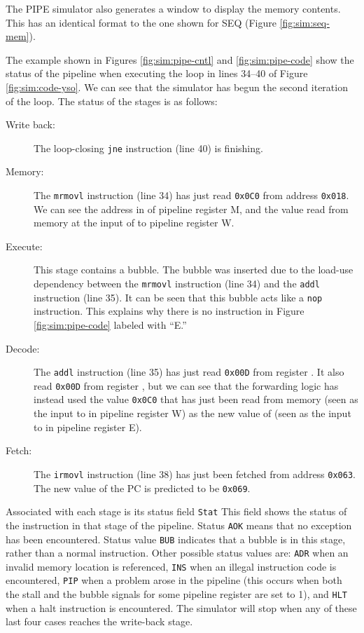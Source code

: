 \documentclass[11pt]{article}
\begin{document}
The PIPE simulator also generates a window to display the memory
contents.  This has an identical format to the one shown for SEQ
(Figure \ref{fig:sim:seq-mem}).

The example shown in Figures \ref{fig:sim:pipe-cntl} and
\ref{fig:sim:pipe-code} show the status of the pipeline when executing
the loop in lines 34--40 of Figure \ref{fig:sim:code-yso}.  We can see
that the simulator has begun the second iteration of the loop.
The status of the stages is as follows:
\begin{description}
\item[Write back:] The loop-closing \texttt{jne} instruction (line 40) is finishing.

\item[Memory:] The \texttt{mrmovl} instruction (line 34) has just read
\texttt{0x0C0} from address \texttt{0x018}.  We can see the address in
 of pipeline register M, and the value read from
memory at the input of  to pipeline register W\@.

\item[Execute:] This stage contains a bubble.  The bubble was inserted
due to the load-use dependency between the \texttt{mrmovl} instruction
(line 34) and the \texttt{addl} instruction (line 35).  It can be seen
that this bubble acts like a \texttt{nop} instruction.  This explains why
there is no instruction in Figure \ref{fig:sim:pipe-code} labeled with ``E.''

\item[Decode:] The \texttt{addl} instruction (line 35) has just read
\texttt{0x00D} from register \eaxreg{}.  It also read \texttt{0x00D}
from register \esireg{}, but we can see that the forwarding logic has
instead used the value \texttt{0x0C0} that has just been read from
memory (seen as the input to  in pipeline register W) as
the new value of  (seen as the input to  in
pipeline register E).

\item[Fetch:] The \texttt{irmovl} instruction (line 38) has just been
fetched from address \texttt{0x063}.  The new value of the PC is
predicted to be \texttt{0x069}.
\end{description}

Associated with each stage is its status field \texttt{Stat}
This field shows the status of the instruction in that
 stage of the pipeline.  Status \texttt{AOK} means that no exception has
 been encountered.  Status value \texttt{BUB} indicates that a bubble is in this
 stage, rather than a normal instruction.  Other possible status
 values are: \texttt{ADR} when an invalid memory location is referenced,
\texttt{INS} when an illegal instruction code is encountered, \texttt{PIP} when
 a problem arose in the pipeline (this occurs when both the stall and
 the bubble signals for some pipeline register are set to 1),
and \texttt{HLT}
 when a halt instruction is encountered.  The simulator will stop
 when any of these last four cases reaches the write-back stage.
\end{document}
